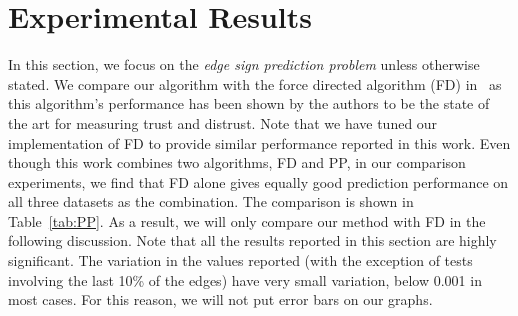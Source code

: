 \documentclass[acmtweb]{acmsmall}
\begin{document}
\section{Experimental Results} \label{sec:results}
In this section, we focus on the {\it edge sign prediction problem}
unless otherwise stated. We compare our algorithm with the force
directed algorithm (FD) in~\cite{golbeck:distrust2011} as this
algorithm's performance has been shown by the authors to be the state
of the art for measuring trust and distrust. Note
that we have tuned our implementation of FD to provide similar
performance reported in this work. Even though this work combines two
algorithms, FD and PP, in our comparison experiments, we find that FD
alone gives equally good prediction performance on all three datasets
as the combination. The comparison is shown in Table~\ref{tab:PP}. As
a result, we will only compare our method with FD in the following
discussion. Note that all the results reported in this section are
highly significant. The variation in the values reported (with the
exception of tests involving the last 10\% of the edges) have very
small variation, below 0.001 in most cases. For this reason, we will
not put error bars on our graphs.

\begin{table}[htp]
\end{table}
\end{document}

